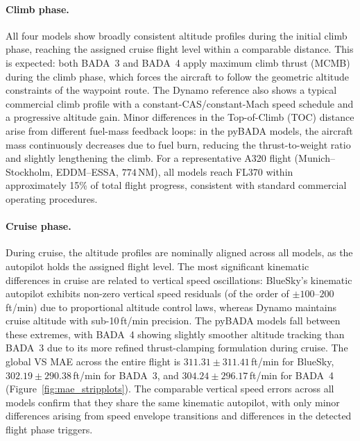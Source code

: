 \paragraph{Climb phase.}
All four models show broadly consistent altitude profiles during the initial climb phase, reaching the assigned cruise flight level within a comparable distance. This is expected: both BADA~3 and BADA~4 apply maximum climb thrust (MCMB) during the climb phase, which forces the aircraft to follow the geometric altitude constraints of the waypoint route. The Dynamo reference also shows a typical commercial climb profile with a constant-CAS/constant-Mach speed schedule and a progressive altitude gain. Minor differences in the Top-of-Climb (TOC) distance arise from different fuel-mass feedback loops: in the pyBADA models, the aircraft mass continuously decreases due to fuel burn, reducing the thrust-to-weight ratio and slightly lengthening the climb. For a representative A320 flight (Munich--Stockholm, EDDM--ESSA, $774$\,NM), all models reach FL370 within approximately 15\% of total flight progress, consistent with standard commercial operating procedures.

\paragraph{Cruise phase.}
During cruise, the altitude profiles are nominally aligned across all models, as the autopilot holds the assigned flight level. The most significant kinematic differences in cruise are related to vertical speed oscillations: BlueSky's kinematic autopilot exhibits non-zero vertical speed residuals (of the order of $\pm 100$--$200$\,ft/min) due to proportional altitude control laws, whereas Dynamo maintains cruise altitude with sub-10\,ft/min precision. The pyBADA models fall between these extremes, with BADA~4 showing slightly smoother altitude tracking than BADA~3 due to its more refined thrust-clamping formulation during cruise. The global VS MAE across the entire flight is $311.31 \pm 311.41$\,ft/min for BlueSky, $302.19 \pm 290.38$\,ft/min for BADA~3, and $304.24 \pm 296.17$\,ft/min for BADA~4 (Figure~\ref{fig:mae_stripplots}). The comparable vertical speed errors across all models confirm that they share the same kinematic autopilot, with only minor differences arising from speed envelope transitions and differences in the detected flight phase triggers.

